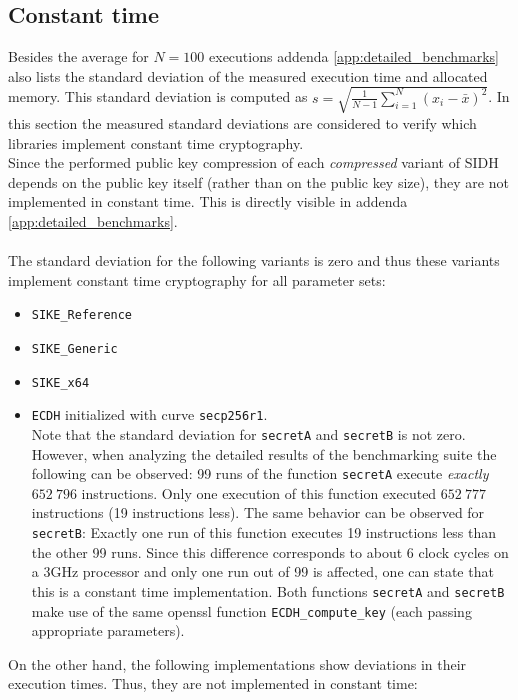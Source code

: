 \subsection{Constant time}\label{sec:analysis_security_time}
Besides the average for $N=100$ executions addenda \ref{app:detailed_benchmarks} also lists the standard deviation of the measured execution time and allocated memory. This standard deviation is computed as $s=\sqrt{\frac{1}{N-1}\sum_{i=1}^N(x_i-\bar{x})^2}$. In this section the measured standard deviations are considered to verify which libraries implement constant time cryptography.\\
Since the performed public key compression of each \textit{compressed} variant of \gls{SIDH} depends on the public key itself (rather than on the public key size), they are not implemented in constant time. This is directly visible in  addenda \ref{app:detailed_benchmarks}.\\\\
The standard deviation for the following variants is zero and thus these variants implement constant time cryptography for all parameter sets:
\begin{itemize}
\item \texttt{SIKE\_Reference}
\item \texttt{SIKE\_Generic} 
\item \texttt{SIKE\_x64}
\item \texttt{\gls{ECDH}} initialized with curve \texttt{secp256r1}.\\
Note that the standard deviation for \texttt{secretA} and \texttt{secretB} is not zero. However, when analyzing the detailed results of the benchmarking suite the following can be observed: 99 runs of the function \texttt{secretA} execute \textit{exactly} $652\:796$ instructions. Only one execution of this function executed $652\:777$ instructions (19 instructions less). The same behavior can be observed for \texttt{secretB}: Exactly one run of this function executes 19 instructions less than the other 99 runs. Since this difference corresponds to about 6 clock cycles on a 3GHz processor and only one run out of 99 is affected, one can state that this is a constant time implementation. Both functions \texttt{secretA} and \texttt{secretB} make use of the same \gls{openssl} function \texttt{ECDH\_compute\_key} (each passing appropriate parameters).
\end{itemize}
On the other hand, the following implementations show deviations in their execution times. Thus, they are not implemented in constant time:

